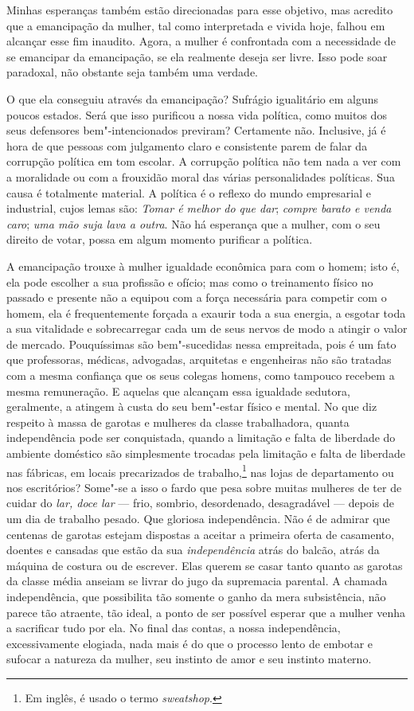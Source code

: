 Minhas esperanças também estão direcionadas para esse objetivo, mas
acredito que a emancipação da mulher, tal como interpretada e vivida
hoje, falhou em alcançar esse fim inaudito. Agora, a mulher é
confrontada com a necessidade de se emancipar da emancipação, se ela
realmente deseja ser livre. Isso pode soar paradoxal, não obstante seja
também uma verdade.

O que ela conseguiu através da emancipação? Sufrágio igualitário em
alguns poucos estados. Será que isso purificou a nossa vida política,
como muitos dos seus defensores bem"-intencionados previram? Certamente
não. Inclusive, já é hora de que pessoas com julgamento claro e
consistente parem de falar da corrupção política em tom escolar.
A corrupção política não tem nada a ver com a\label{suja}
moralidade ou com a frouxidão moral das várias personalidades
políticas. Sua causa é totalmente material. A política é o reflexo do
mundo empresarial e industrial, cujos lemas são: \textit{Tomar é melhor do que
dar}; \textit{compre barato e venda caro}; \textit{uma mão suja lava a outra}.
Não há esperança que a mulher, com o seu direito de votar, possa em
algum momento purificar a política.

A emancipação trouxe à mulher igualdade econômica para com o homem; isto
é, ela pode escolher a sua profissão e ofício; mas como o treinamento
físico no passado e presente não a equipou com a força necessária para
competir com o homem, ela é frequentemente forçada a exaurir toda a sua
energia, a esgotar toda a sua vitalidade e sobrecarregar cada um de seus
nervos de modo a atingir o valor de mercado. Pouquíssimas são
bem"-sucedidas nessa empreitada, pois é um fato que professoras, médicas,
advogadas, arquitetas e engenheiras não são tratadas com a mesma
confiança que os seus colegas homens, como tampouco recebem a mesma\label{igualdade}
remuneração. E aquelas que alcançam essa igualdade sedutora, geralmente,
a atingem à custa do seu bem"-estar físico e mental. No que diz respeito
à massa de garotas e mulheres da classe trabalhadora, quanta
independência pode ser conquistada, quando a limitação e falta de
liberdade do ambiente doméstico são simplesmente trocadas pela limitação e falta de
liberdade nas fábricas, em locais precarizados de trabalho,\footnote{Em inglês, é usado o termo \textit{sweatshop}.} nas lojas de departamento ou nos escritórios?
Some"-se a isso o fardo que pesa sobre muitas mulheres de ter de cuidar
do \textit{lar, doce lar} --- frio, sombrio, desordenado, desagradável --- depois de um dia de trabalho pesado. Que gloriosa independência. Não é
de admirar que centenas de garotas estejam dispostas a aceitar a
primeira oferta de casamento, doentes e cansadas que estão da sua
\textit{independência} atrás do balcão, atrás da máquina de costura ou de
escrever. Elas querem se casar tanto quanto as garotas da classe média
anseiam se livrar do jugo da supremacia parental. A chamada\label{ganho}
independência, que possibilita tão somente o ganho da mera subsistência,
não parece tão atraente, tão ideal, a ponto de ser possível esperar que
a mulher venha a sacrificar tudo por ela. No final das contas, a nossa
independência, excessivamente elogiada, nada mais é do que o processo
lento de embotar e sufocar a natureza da mulher, seu instinto de amor e
seu instinto materno.

